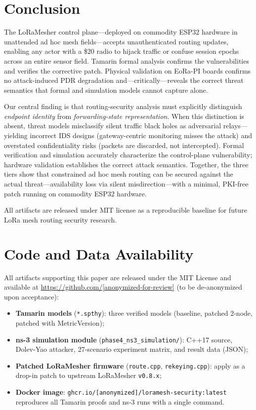 \documentclass[preprint,12pt]{elsarticle}
\begin{document}
\section{Conclusion}
\label{sec:conclusion}

The LoRaMesher control plane—deployed on commodity ESP32 hardware
in unattended ad hoc mesh fields—accepts unauthenticated routing
updates, enabling any actor with a \$20 radio to hijack traffic
or confuse session epochs across an entire sensor field.
Tamarin formal analysis confirms the vulnerabilities and verifies
the corrective patch.
Physical validation on EoRa-PI boards confirms no attack-induced
PDR degradation and—critically—reveals the correct threat
semantics that formal and simulation models cannot capture alone.

Our central finding is that routing-security analysis must
explicitly distinguish \emph{endpoint identity} from
\emph{forwarding-state representation}.
When this distinction is absent, threat models misclassify
silent traffic black holes as adversarial relays—yielding
incorrect IDS designs (gateway-centric monitoring misses the
attack) and overstated confidentiality risks (packets are
discarded, not intercepted).
Formal verification and simulation accurately characterize the
control-plane vulnerability; hardware validation establishes
the correct attack semantics.
Together, the three tiers show that constrained ad hoc mesh
routing can be secured against the actual threat—availability
loss via silent misdirection—with a minimal, PKI-free patch
running on commodity ESP32 hardware.

All artifacts are released under MIT license as a reproducible
baseline for future LoRa mesh routing security research.

\section*{Code and Data Availability}

All artifacts supporting this paper are released under the MIT License
and available at \url{https://github.com/[anonymized-for-review]}
(to be de-anonymized upon acceptance):

\begin{itemize}
  \item \textbf{Tamarin models} (\texttt{*.spthy}):
    three verified models (baseline, patched 2-node, patched with MetricVersion);
  \item \textbf{ns-3 simulation module} (\texttt{phase4\_ns3\_simulation/}):
    C++17 source, Dolev-Yao attacker, 27-scenario experiment matrix, and
    result data (JSON);
  \item \textbf{Patched LoRaMesher firmware} (\texttt{route.cpp},
    \texttt{rekeying.cpp}): apply as a drop-in patch to upstream
    LoRaMesher \texttt{v0.8.x};
  \item \textbf{Docker image}:
    \texttt{ghcr.io/[anonymized]/loramesh-security:latest}
    reproduces all Tamarin proofs and ns-3 runs with a single command.
\end{itemize}
\end{document}
